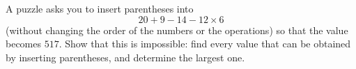 A puzzle asks you to insert parentheses into
\[
20+9-14-12\times6
\]
(without changing the order of the numbers or the operations) so that the value becomes $517$. Show that this is impossible: find every value that can be obtained by inserting parentheses, and determine the largest one.
